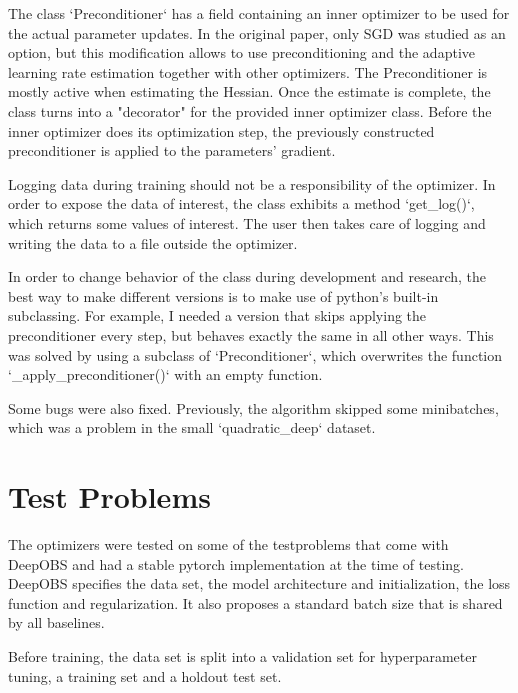 \documentclass[twoside,12pt,a4paper]{report}
\begin{document}
\begin{markdown}
The class `Preconditioner` has a field containing an inner optimizer to be used for the actual parameter updates. In the original paper, only SGD was studied as an option, but this modification allows to use preconditioning and the adaptive learning rate estimation together with other optimizers. The Preconditioner is mostly active when estimating the Hessian. Once the estimate is complete, the class turns into a "decorator" for the provided inner optimizer class. Before the inner optimizer does its optimization step, the previously constructed preconditioner is applied to the parameters' gradient.

Logging data during training should not be a responsibility of the optimizer. In order to expose the data of interest, the class exhibits a method `get_log()`, which returns some values of interest. The user then takes care of logging and writing the data to a file outside the optimizer.

In order to change behavior of the class during development and research, the best way to make different versions is to make use of python's built-in subclassing. For example, I needed a version that skips applying the preconditioner every step, but behaves exactly the same in all other ways. This was solved by using a subclass of `Preconditioner`, which overwrites the function `_apply_preconditioner()` with an empty function.

Some bugs were also fixed. Previously, the algorithm skipped some minibatches, which was a problem in the small `quadratic_deep` dataset.
\end{markdown}

\section{Test Problems}
The optimizers were tested on some of the testproblems that come with DeepOBS and had a stable pytorch implementation at the time of testing. DeepOBS specifies the data set, the model architecture and initialization, the loss function and regularization. It also proposes a standard batch size that is shared by all baselines.

Before training, the data set is split into a validation set for hyperparameter tuning, a training set and a holdout test set.
\end{document}
